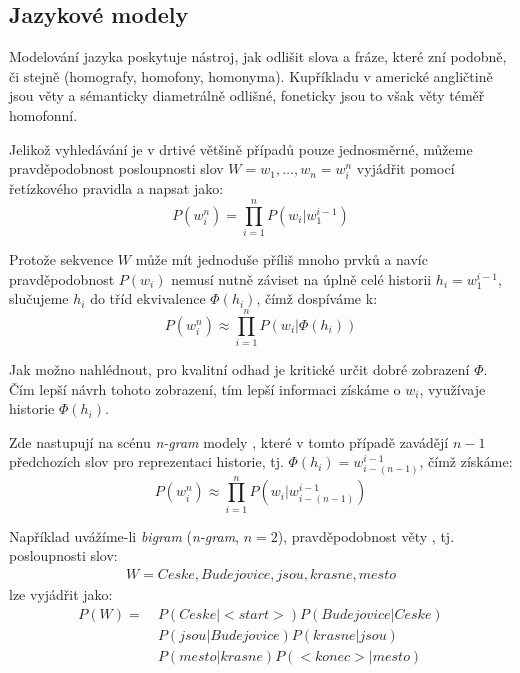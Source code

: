 \subsection{Jazykové modely}

Modelování jazyka poskytuje nástroj, jak odlišit slova a fráze, které zní podobně, či stejně (homografy, homofony, homonyma). Kupříkladu v americké angličtině jsou věty  a  sémanticky diametrálně odlišné, foneticky jsou to však věty téměř homofonní. 

Jelikož vyhledávání je v drtivé většině případů pouze jednosměrné, můžeme pravděpodobnost posloupnosti slov $W = w_1, \dots, w_n = w^n_i$ vyjádřit pomocí řetízkového pravidla a napsat jako:
%
\begin{equation}
	\label{eq:lm}
	P(w^n_i) = \prod\limits_{i=1}^n P(w_i|w^{i-1}_1)
\end{equation}

Protože sekvence $W$ může mít jednoduše příliš mnoho prvků a navíc pravděpodobnost $P(w_i)$ nemusí nutně záviset na úplně celé historii $h_i = w_1^{i-1}$, slučujeme $h_i$ do tříd ekvivalence $\Phi (h_i)$, čímž dospíváme k:
%
\begin{equation}
	\label{eq:lm_ec}
	P(w^n_i) \approx \prod\limits_{i=1}^n P(w_i|\Phi (h_i))
\end{equation}

Jak možno nahlédnout, pro kvalitní odhad je kritické určit dobré zobrazení $\Phi$. Čím lepší návrh tohoto zobrazení, tím lepší informaci získáme o $w_i$, využívaje historie $\Phi (h_i)$.

Zde nastupují na scénu {\sl n-gram} modely \cite{byeo_2012}\cite{masa_1997}, které v tomto případě zavádějí $n-1$ předchozích slov pro reprezentaci historie, tj. $\Phi (h_i) = w_{i-(n-1)}^{i-1}$, čímž získáme:
%
\begin{equation}
	\label{eq:lm_ec}
	P(w^n_i) \approx \prod\limits_{i=1}^n P(w_i|w_{i-(n-1)}^{i-1})
\end{equation}

Například uvážíme-li {\sl bigram} ({\sl n-gram}, $n = 2$), pravděpodobnost věty , tj. posloupnosti slov:
%
\begin{align*}
	W = Ceske, Budejovice, jsou, krasne, mesto
\end{align*}
%
lze vyjádřit jako:
%
\begin{align*}
	P(W) =&~P(Ceske|<\! start\!>)P(Budejovice|Ceske)\\
	      &~P(jsou|Budejovice)P(krasne|jsou)\\
	      &~P(mesto|krasne)P(<\! konec\!>|mesto)
\end{align*}

